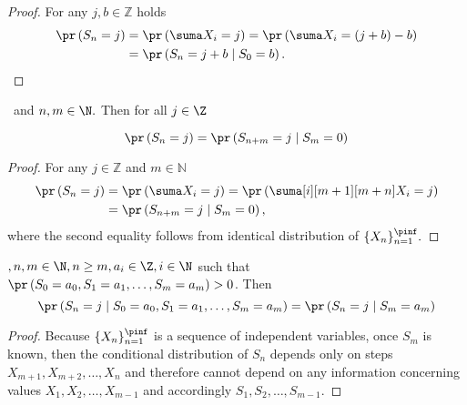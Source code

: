 \begin{proof} For any $j, b \in \mathbb Z$ holds
  \[
    \begin{split}
      \pr \left( S_n=j \right) & =\pr \left( \suma X_i=j
      \right)
      =\pr \left( \suma X_i=  \left(j+b\right)  - b \right) \\
      & =\pr \left( S_n=j+b \mid S_0=b \right).
    \end{split}
 \]
\end{proof}


\begin{lemma}\label{lemma-temporal_homogeneity}
  \Lrw\ and $n,m \in \N.$ Then for all $j \in \Z$

   \[
     \pr \left( S_n=j \right) =\pr \left( S_{n+m}=j \mid
       S_m=0\right)
   \]
\end{lemma}
\begin{proof} For any $j \in \mathbb Z$ and $m \in \mathbb N$
  \[
    \begin{split}
      \pr \left( S_n=j  \right) & =\pr \left( \suma X_i=j\right)
      =\pr \left( \suma[i][m+1][m+n]X_i=j \right)\\
      & =\pr \left( S_{n+m}=j \mid S_m=0 \right),
    \end{split}
  \]
where the second equality follows from identical distribution of
$\{X_n\}_{n=1}^{\pinf}.$
\end{proof}

\begin{lemma}\label{lemma-markov_property}
 \Lrw $,n,m \in \N, n\geq m, a_i \in \Z, i\in \N$ such that $\pr \left(S_0=a_0, S_1=a_1, \ldots, S_m=a_m\right)>0$. Then
 \[
     \pr \left( S_n=j \mid S_0=a_0, S_1=a_1, \ldots, S_m=a_m \right)
     =\pr \left( S_n=j \mid S_m=a_m \right)
 \]
\end{lemma}
\begin{proof}
 Because $\{X_n\}_{n=1}^\pinf$ is a sequence of independent variables, once $S_m$ is known, then the conditional distribution of $S_n$ depends only on steps ~\\$X_{m+1}, X_{m+2}, \ldots, X_n$ and therefore cannot depend on any information concerning values $X_1, X_2, \ldots, X_{m-1}$ and accordingly $S_1, S_2, \ldots, S_{m-1}.$
\end{proof}
